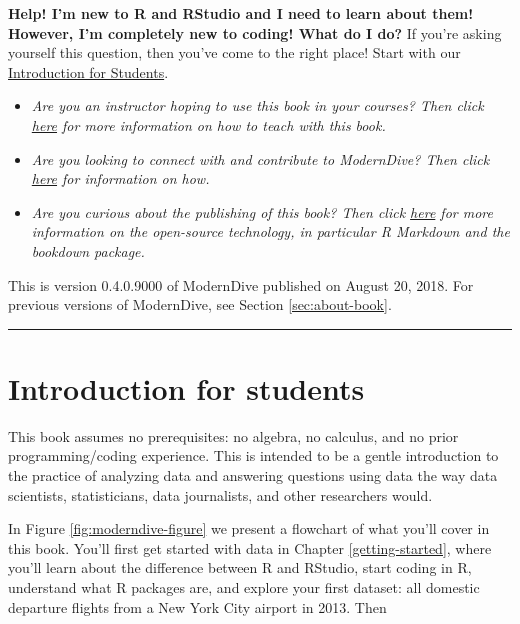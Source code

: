 \documentclass[12pt,]{krantz}
\providecommand{\tightlist}{%
  \setlength{\itemsep}{0pt}\setlength{\parskip}{0pt}}
\theoremstyle{definition}
\theoremstyle{definition}
\theoremstyle{definition}
\theoremstyle{remark}
\begin{document}
\textbf{Help! I'm new to R and RStudio and I need to learn about them!
However, I'm completely new to coding! What do I do?} If you're asking
yourself this question, then you've come to the right place! Start with
our \protect\hyperlink{sec:intro-for-students}{Introduction for
Students}.

\begin{itemize}
\tightlist
\item
  \emph{Are you an instructor hoping to use this book in your courses?
  Then click \protect\hyperlink{sec:intro-instructors}{here} for more
  information on how to teach with this book.}
\item
  \emph{Are you looking to connect with and contribute to ModernDive?
  Then click \protect\hyperlink{sec:connect-contribute}{here} for
  information on how.}
\item
  \emph{Are you curious about the publishing of this book? Then click
  \protect\hyperlink{sec:about-book}{here} for more information on the
  open-source technology, in particular R Markdown and the bookdown
  package.}
\end{itemize}

This is version 0.4.0.9000 of ModernDive published on August 20, 2018.
For previous versions of ModernDive, see Section \ref{sec:about-book}.

\begin{center}\rule{0.5\linewidth}{\linethickness}\end{center}

\hypertarget{sec:intro-for-students}{\section{Introduction for
students}\label{sec:intro-for-students}}

This book assumes no prerequisites: no algebra, no calculus, and no
prior programming/coding experience. This is intended to be a gentle
introduction to the practice of analyzing data and answering questions
using data the way data scientists, statisticians, data journalists, and
other researchers would.

In Figure \ref{fig:moderndive-figure} we present a flowchart of what
you'll cover in this book. You'll first get started with data in Chapter
\ref{getting-started}, where you'll learn about the difference between R
and RStudio, start coding in R, understand what R packages are, and
explore your first dataset: all domestic departure flights from a New
York City airport in 2013. Then
\end{document}
